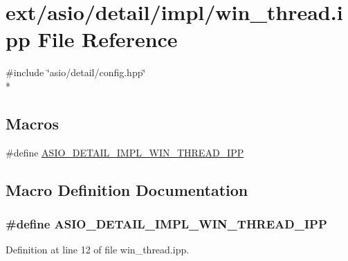 \hypertarget{win__thread_8ipp}{}\section{ext/asio/detail/impl/win\+\_\+thread.ipp File Reference}
\label{win__thread_8ipp}
{\ttfamily \#include \char`\"{}asio/detail/config.\+hpp\char`\"{}}\\*
\subsection*{Macros}
\begin{DoxyCompactItemize}
\item 
\#define \hyperlink{win__thread_8ipp_ae9f4eb53afe69a2b182898b5ee7abc74}{A\+S\+I\+O\+\_\+\+D\+E\+T\+A\+I\+L\+\_\+\+I\+M\+P\+L\+\_\+\+W\+I\+N\+\_\+\+T\+H\+R\+E\+A\+D\+\_\+\+I\+P\+P}
\end{DoxyCompactItemize}


\subsection{Macro Definition Documentation}
\hypertarget{win__thread_8ipp_ae9f4eb53afe69a2b182898b5ee7abc74}{}
\subsubsection[{A\+S\+I\+O\+\_\+\+D\+E\+T\+A\+I\+L\+\_\+\+I\+M\+P\+L\+\_\+\+W\+I\+N\+\_\+\+T\+H\+R\+E\+A\+D\+\_\+\+I\+P\+P}]{\setlength{\rightskip}{0pt plus 5cm}\#define A\+S\+I\+O\+\_\+\+D\+E\+T\+A\+I\+L\+\_\+\+I\+M\+P\+L\+\_\+\+W\+I\+N\+\_\+\+T\+H\+R\+E\+A\+D\+\_\+\+I\+P\+P}\label{win__thread_8ipp_ae9f4eb53afe69a2b182898b5ee7abc74}


Definition at line 12 of file win\+\_\+thread.\+ipp.

